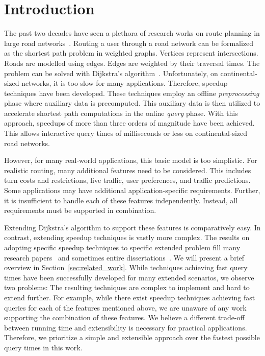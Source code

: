 \documentclass[manuscript]{acmart}
\begin{document}


\maketitle

\section{Introduction}
\label{sec:intro}
The past two decades have seen a plethora of research works on route planning in large road networks~\cite{bdgmpsww-rptn-16}.
Routing a user through a road network can be formalized as the shortest path problem in weighted graphs.
Vertices represent intersections.
Roads are modelled using edges.
Edges are weighted by their traversal times.
The problem can be solved with Dijkstra's algorithm~\cite{d-ntpcg-59}.
Unfortunately, on continental-sized networks, it is too slow for many applications.
Therefore, speedup techniques have been developed.
These techniques employ an offline \emph{preprocessing} phase where auxiliary data is precomputed.
This auxiliary data is then utilized to accelerate shortest path computations in the online \emph{query} phase.
With this approach, speedups of more than three orders of magnitude have been achieved.
This allows interactive query times of milliseconds or less on continental-sized road networks.

However, for many real-world applications, this basic model is too simplistic.
For realistic routing, many additional features need to be considered.
This includes turn costs and restrictions, live traffic, user preferences, and traffic predictions.
Some applications may have additional application-specific requirements.
Further, it is insufficient to handle each of these features independently.
Instead, all requirements must be supported in combination.

Extending Dijkstra's algorithm to support these features is comparatively easy.
In contrast, extending speedup techniques is vastly more complex.
The results on adopting specific speedup techniques to specific extended problem fill many research papers~\cite{gv-errnt-11,dgpw-crprn-13,dsw-cch-15,bwzz-cchtc-20,bgsv-mtdtt-13,swz-sfert-21} and sometimes entire dissertations~\cite{Delling2009_1000011046,b-tdrpc-14,Baum2018_1000082225}.
We will present a brief overview in Section~\ref{sec:related_work}.
While techniques achieving fast query times have been successfully developed for many extended scenarios, we observe two problems:
The resulting techniques are complex to implement and hard to extend further.
For example, while there exist speedup techniques achieving fast queries for each of the features mentioned above, we are unaware of any work supporting the combination of these features.
We believe a different trade-off between running time and extensibility is necessary for practical applications.
Therefore, we prioritize a simple and extensible approach over the fastest possible query times in this work.
\end{document}
